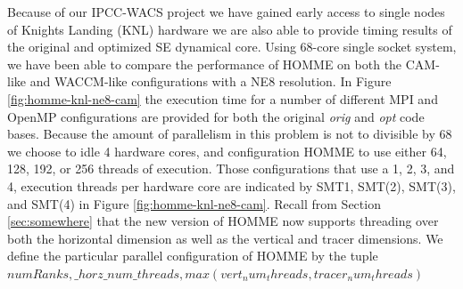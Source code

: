 Because of our IPCC-WACS project we have gained early access to single nodes of Knights Landing (KNL) hardware we are also able to provide timing results of the original and optimized SE dynamical core.  Using 68-core single socket system, we have been able to compare the performance of HOMME on both the CAM-like and WACCM-like configurations with a NE8 resolution.  In Figure \ref{fig:homme-knl-ne8-cam} the execution time for a number of different MPI and OpenMP configurations are provided for both the original {\em orig} and {\em opt} code bases.  Because the amount of parallelism in this problem is not to divisible by 68 we choose to idle 4 hardware cores, and configuration HOMME to use either 64, 128, 192, or 256 threads of execution.  Those configurations that use a 1, 2, 3, and 4, execution threads per hardware core are indicated by SMT{1}, SMT(2), SMT(3), and SMT(4) in Figure \ref{fig:homme-knl-ne8-cam}.  Recall from Section \ref{sec:somewhere} that the new version of HOMME  now supports threading over both the horizontal dimension as well as the vertical and tracer dimensions.  We define the particular parallel configuration of HOMME by the tuple 
$
numRanks, \_ horz\_num\_threads, max(vert_num_threads,tracer_num_threads)
$
